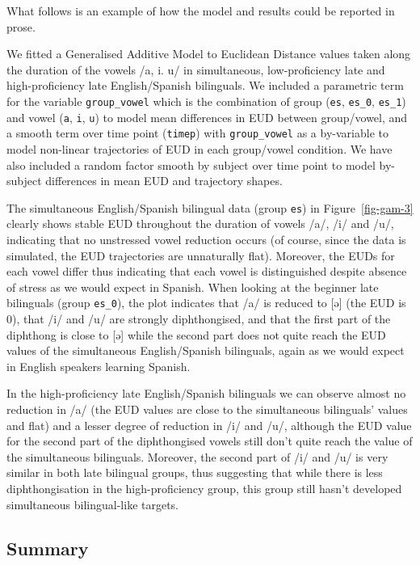 \documentclass[
  letterpaper,
  DIV=11,
  numbers=noendperiod]{scrartcl}
\begin{document}
What follows is an example of how the model and results could be
reported in prose.

We fitted a Generalised Additive Model to Euclidean Distance values
taken along the duration of the vowels /a, i. u/ in simultaneous,
low-proficiency late and high-proficiency late English/Spanish
bilinguals. We included a parametric term for the variable
\texttt{group\_vowel} which is the combination of group (\texttt{es},
\texttt{es\_0}, \texttt{es\_1}) and vowel (\texttt{a}, \texttt{i},
\texttt{u}) to model mean differences in EUD between group/vowel, and a
smooth term over time point (\texttt{timep}) with \texttt{group\_vowel}
as a by-variable to model non-linear trajectories of EUD in each
group/vowel condition. We have also included a random factor smooth by
subject over time point to model by-subject differences in mean EUD and
trajectory shapes.

The simultaneous English/Spanish bilingual data (group \texttt{es}) in
Figure~\ref{fig-gam-3} clearly shows stable EUD throughout the duration
of vowels /a/, /i/ and /u/, indicating that no unstressed vowel
reduction occurs (of course, since the data is simulated, the EUD
trajectories are unnaturally flat). Moreover, the EUDs for each vowel
differ thus indicating that each vowel is distinguished despite absence
of stress as we would expect in Spanish. When looking at the beginner
late bilinguals (group \texttt{es\_0}), the plot indicates that /a/ is
reduced to {[}ə{]} (the EUD is 0), that /i/ and /u/ are strongly
diphthongised, and that the first part of the diphthong is close to
{[}ə{]} while the second part does not quite reach the EUD values of the
simultaneous English/Spanish bilinguals, again as we would expect in
English speakers learning Spanish.

In the high-proficiency late English/Spanish bilinguals we can observe
almost no reduction in /a/ (the EUD values are close to the simultaneous
bilinguals' values and flat) and a lesser degree of reduction in /i/ and
/u/, although the EUD value for the second part of the diphthongised
vowels still don't quite reach the value of the simultaneous bilinguals.
Moreover, the second part of /i/ and /u/ is very similar in both late
bilingual groups, thus suggesting that while there is less
diphthongisation in the high-proficiency group, this group still hasn't
developed simultaneous bilingual-like targets.

\subsection{Summary}\label{summary}
\end{document}
